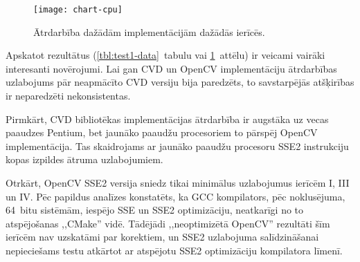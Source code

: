 \begin{figure}[tbh]
	\centering
	\texttt{[image: chart-cpu]}
	\caption{Ātrdarbība dažādām implementācijām dažādās ierīcēs.}
	\label{fig:test1-data}
\end{figure}

Apskatot rezultātus (\ref{tbl:test1-data}~tabulu vai \ref{fig:test1-data}~attēlu)
ir veicami vairāki interesanti novērojumi. Lai gan CVD un OpenCV implementāciju
ātrdarbības uzlabojums pār neapmācīto CVD versiju bija paredzēts, to
savstarpējās atšķirības ir neparedzēti nekonsistentas.

Pirmkārt, CVD bibliotēkas implementācijas ātrdarbība ir augstāka uz vecas
paaudzes Pentium, bet jaunāko paaudžu procesoriem to pārspēj OpenCV
implementācija. Tas skaidrojams ar jaunāko paaudžu procesoru
SSE2 instrukciju kopas izpildes ātruma uzlabojumiem.

Otrkārt, OpenCV SSE2 versija sniedz tikai minimālus uzlabojumus ierīcēm
I, III un IV. Pēc papildus analīzes konstatēts, ka GCC kompilators,
pēc noklusējuma, 64~bitu sistēmām, iespējo SSE un SSE2 optimizāciju,
neatkarīgi no to atspējošanas ,,CMake'' vidē.
Tādējādi ,,neoptimizētā OpenCV'' rezultāti
šīm ierīcēm nav uzskatāmi par korektiem, un SSE2 uzlabojuma
salīdzināšanai nepieciešams testu atkārtot ar atspējotu SSE2 optimizāciju
kompilatora līmenī.
